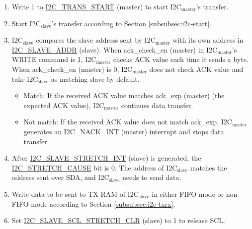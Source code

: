 \documentclass[main\_\_EN.tex]{subfiles}
\begin{document}
\begin{enumerate}
\item Write 1 to \hyperref[fielddesc:I2CTRANSSTART]{I2C\_TRANS\_START} (master) to start I2C$_\text{master}$'s transfer.
\item Start I2C$_\text{slave}$'s transfer according to Section \ref{subsubsec:i2c-start}.
\item I2C$_\text{slave}$ compares the slave address sent by I2C$_\text{master}$ with its own address in \hyperref[fielddesc:I2CSLAVEADDR]{I2C\_SLAVE\_ADDR} (slave). When ack\_check\_en (master) in I2C$_\text{master}$'s WRITE command is 1, I2C$_\text{master}$ checks ACK value each time it sends a byte. When ack\_check\_en (master) is 0, I2C$_\text{master}$ does not check ACK value and take I2C$_\text{slave}$ as matching slave by default.
\begin{itemize}
\item Match: If the received ACK value matches ack\_exp (master) (the expected ACK value), I2C$_\text{master}$ continues data transfer.
\item Not match: If the received ACK value does not match ack\_exp, I2C$_\text{master}$ generates an I2C\_NACK\_INT (master) interrupt and stops data transfer.
\end{itemize}

\item After \hyperref[int:i2c-slave-stretch]{I2C\_SLAVE\_STRETCH\_INT} (slave) is generated, the \hyperref[fielddesc:I2CSTRETCHCAUSE]{I2C\_STRETCH\_CAUSE} bit is 0. The address of I2C$_\text{slave}$ matches the address sent over SDA, and I2C$_\text{slave}$ needs to send data.

\item Write data to be sent to TX RAM of I2C$_\text{slave}$ in either FIFO mode or non-FIFO mode according to Section \ref{subsubsec:i2c-txrx}.
\item Set \hyperref[fielddesc:I2CSLAVESCLSTRETCHCLR]{I2C\_SLAVE\_SCL\_STRETCH\_CLR} (slave) to 1 to release SCL.


\end{enumerate}
\end{document}
